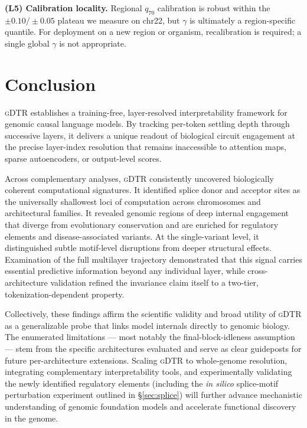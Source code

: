\documentclass[12pt]{article}
\theoremstyle{plain}
\theoremstyle{definition}
\theoremstyle{remark}
\newcommand{\gDTR}{\textsc{gDTR}}
\begin{document}
\textbf{(L5) Calibration locality.} Regional $q_{70}$ calibration is
robust within the $\pm 0.10/\pm 0.05$ plateau we measure on chr22, but
$\gamma$ is ultimately a region-specific quantile. For deployment on a
new region or organism, recalibration is required; a single global
$\gamma$ is not appropriate.

\section{Conclusion}
\label{sec:conclusion}

\gDTR{} establishes a training-free, layer-resolved interpretability
framework for genomic causal language models. By tracking per-token
settling depth through successive layers, it delivers a unique readout
of biological circuit engagement at the precise layer-index resolution
that remains inaccessible to attention maps, sparse autoencoders, or
output-level scores.

Across complementary analyses, \gDTR{} consistently uncovered
biologically coherent computational signatures. It identified splice
donor and acceptor sites as the universally shallowest loci of
computation across chromosomes and architectural families. It revealed
genomic regions of deep internal engagement that diverge from
evolutionary conservation and are enriched for regulatory elements and
disease-associated variants. At the single-variant level, it
distinguished subtle motif-level disruptions from deeper structural
effects. Examination of the full multilayer trajectory demonstrated
that this signal carries essential predictive information beyond any
individual layer, while cross-architecture validation refined the
invariance claim itself to a two-tier, tokenization-dependent property.

Collectively, these findings affirm the scientific validity and broad
utility of \gDTR{} as a generalizable probe that links model internals
directly to genomic biology. The enumerated limitations --- most
notably the final-block-idleness assumption --- stem from the specific
architectures evaluated and serve as clear guideposts for future
per-architecture extensions. Scaling \gDTR{} to whole-genome
resolution, integrating complementary interpretability tools, and
experimentally validating the newly identified regulatory elements
(including the \emph{in silico} splice-motif perturbation experiment
outlined in \S\ref{sec:splice}) will further advance mechanistic
understanding of genomic foundation models and accelerate functional
discovery in the genome.
\end{document}
